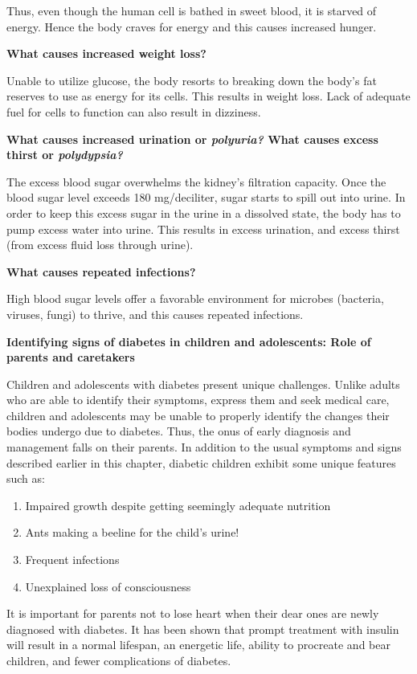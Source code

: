 Thus, even though the human cell is bathed in sweet blood, it is starved of energy. Hence the body craves for energy and this causes increased hunger.

\noindent
\textbf{What causes increased weight loss?}

Unable to utilize glucose, the body resorts to breaking down the body’s fat reserves to use as energy for its cells. This results in weight loss. Lack of adequate fuel for cells to function can also result in dizziness.

\clearpage
\noindent
\textbf{What causes increased urination or \textit{polyuria?} What causes excess thirst or \textit{polydypsia?}}

The excess blood sugar overwhelms the kidney’s filtration capa\-city. Once the blood sugar level exceeds 180 mg/deciliter, sugar starts to spill out into urine. In order to keep this excess sugar in the urine in a dissolved state, the body has to pump excess water into urine. This results in excess urination, and excess thirst (from excess fluid loss through urine).

\noindent
\textbf{What causes repeated infections?}

High blood sugar levels offer a favorable environment for microbes (bacteria, viruses, fungi) to thrive, and this causes repeated infections.

\noindent
\textbf{Identifying signs of diabetes in children and adolescents: Role of parents and caretakers}

Children and adolescents with diabetes present unique challenges. Unlike adults who are able to identify their symptoms, express them and seek medical care, children and adolescents may be unable to properly identify the changes their bodies undergo due to diabetes. Thus, the onus of early diagnosis and management falls on their parents. In addition to the usual symptoms and signs described earlier in this chapter, diabetic children exhibit some unique features such as:

\begin{enumerate}[\ding{226}]
\itemsep=0pt
\item Impaired growth despite getting seemingly adequate nutrition
\item Ants making a beeline for the child’s urine!
\item Frequent infections
\item Unexplained loss of consciousness
\end{enumerate}

It is important for parents not to lose heart when their dear ones are newly diagnosed with diabetes. It has been shown that prompt treatment with insulin will result in a normal lifespan, an energetic life, ability to procreate and bear children, and fewer complications of diabetes.

